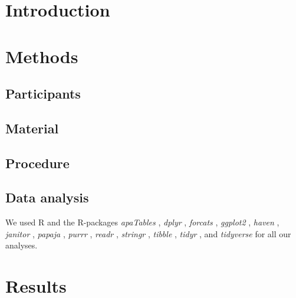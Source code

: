\documentclass[
  english,
  man,floatsintext]{apa6}
\begin{document}
\hypertarget{introduction}{%
\section{Introduction}\label{introduction}}

\hypertarget{methods}{%
\section{Methods}\label{methods}}

\hypertarget{participants}{%
\subsection{Participants}\label{participants}}

\hypertarget{material}{%
\subsection{Material}\label{material}}

\hypertarget{procedure}{%
\subsection{Procedure}\label{procedure}}

\hypertarget{data-analysis}{%
\subsection{Data analysis}\label{data-analysis}}

We used R \autocite[Version 4.0.2;][]{R-base} and the R-packages \emph{apaTables} \autocite[Version 2.0.5;][]{R-apaTables}, \emph{dplyr} \autocite[Version 1.0.2;][]{R-dplyr}, \emph{forcats} \autocite[Version 0.5.0;][]{R-forcats}, \emph{ggplot2} \autocite[Version 3.3.2;][]{R-ggplot2}, \emph{haven} \autocite[Version 2.3.1;][]{R-haven}, \emph{janitor} \autocite[Version 2.0.1;][]{R-janitor}, \emph{papaja} \autocite[Version 0.1.0.9997;][]{R-papaja}, \emph{purrr} \autocite[Version 0.3.4;][]{R-purrr}, \emph{readr} \autocite[Version 1.4.0;][]{R-readr}, \emph{stringr} \autocite[Version 1.4.0;][]{R-stringr}, \emph{tibble} \autocite[Version 3.0.4;][]{R-tibble}, \emph{tidyr} \autocite[Version 1.1.2;][]{R-tidyr}, and \emph{tidyverse} \autocite[Version 1.3.0;][]{R-tidyverse} for all our analyses.

\hypertarget{results}{%
\section{Results}\label{results}}
\end{document}
